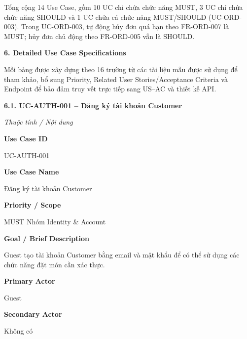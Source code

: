 \documentclass[11pt,a4paper,oneside]{report}
\begin{document}
Tổng cộng 14 Use Case, gồm 10 UC chỉ chứa chức năng MUST, 3 UC chỉ chứa chức năng SHOULD và 1 UC chứa cả chức năng MUST/SHOULD (UC-ORD-003). Trong UC-ORD-003, tự động hủy đơn quá hạn theo FR-ORD-007 là MUST; hủy đơn chủ động theo FR-ORD-005 vẫn là SHOULD.

\textbf{6. Detailed Use Case Specifications}

Mỗi bảng được xây dựng theo 16 trường từ các tài liệu mẫu được sử dụng để tham khảo, bổ sung Priority, Related User Stories/Acceptance Criteria và Endpoint để bảo đảm truy vết trực tiếp sang US--AC và thiết kế API.

\textbf{6.1. UC-AUTH-001 -- Đăng ký tài khoản Customer}



\par\noindent\textit{Thuộc tính / Nội dung}\par

\par\smallskip\noindent\textcolor{sgublue}{\textbf{Use Case ID}}\par\nobreak
UC-AUTH-001
\par

\par\smallskip\noindent\textcolor{sgublue}{\textbf{Use Case Name}}\par\nobreak
Đăng ký tài khoản Customer
\par

\par\smallskip\noindent\textcolor{sgublue}{\textbf{Priority / Scope}}\par\nobreak
MUST \textbar{} Nhóm Identity \& Account
\par

\par\smallskip\noindent\textcolor{sgublue}{\textbf{Goal / Brief Description}}\par\nobreak
Guest tạo tài khoản Customer bằng email và mật khẩu để có thể sử dụng các chức năng đặt món cần xác thực.
\par

\par\smallskip\noindent\textcolor{sgublue}{\textbf{Primary Actor}}\par\nobreak
Guest
\par

\par\smallskip\noindent\textcolor{sgublue}{\textbf{Secondary Actor}}\par\nobreak
Không có
\par
\end{document}
